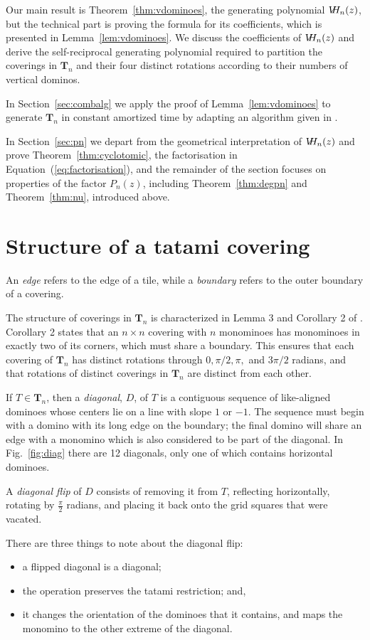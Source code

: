 \documentclass[12pt]{amsart}
\newcommand{\lref}[1]{Lemma~\ref{lem:#1}}
\newcommand{\eref}[1]{Equation~(\ref{eq:#1})}
\newcommand{\sref}[1]{Section~\ref{sec:#1}}
\newcommand{\tref}[1]{Theorem~\ref{thm:#1}}
\newcommand{\fref}[1]{Fig.~\ref{fig:#1}}
\newcommand{\Tn}[1]{\mathbf T_{#1}}
\newcommand{\vh}{V\hspace{-5pt}H}
\begin{document}
Our main result is \tref{vdominoes}, the generating polynomial
$\vh_n(z)$, but the technical part is proving the formula for its
coefficients, which is presented in \lref{vdominoes}.  We discuss the
coefficients of $\vh_n(z)$ and derive the self-reciprocal generating
polynomial required to partition the coverings in $\Tn{n}$ and their
four distinct rotations according to their numbers of vertical
dominos.

In \sref{combalg} we apply the proof of \lref{vdominoes} to generate
$\Tn{n}$ in constant amortized time by adapting an algorithm given in
\cite{BaronaigienRuskey1993}.

In \sref{pn} we depart from the geometrical interpretation of
$\vh_n(z)$ and prove \tref{cyclotomic}, the factorisation in
\eref{factorisation}, and the remainder of the section focuses on
properties of the factor $P_n(z)$, including \tref{degpn} and
\tref{nu}, introduced above.


\section{Structure of a tatami covering}
\label{sec:structure}
An \emph{edge} refers to the edge of a tile, while a \emph{boundary}
refers to the outer boundary of a covering.

The structure of coverings in $\Tn{n}$ is characterized in Lemma 3 and
Corollary 2 of \cite{EricksonRuskeySchurch2011}.  Corollary 2 states
that an $n\times n$ covering with $n$ monominoes has monominoes in
exactly two of its corners, which must share a boundary.  This ensures
that each covering of $\Tn{n}$ has distinct rotations through
$0,\pi/2,\pi,$ and $3\pi/2$ radians, and that rotations of distinct
coverings in $\Tn{n}$ are distinct from each other.

If $T\in \Tn{n}$, then a \emph{diagonal}, $D$, of $T$ is a contiguous
sequence of like-aligned dominoes whose centers lie on a line with
slope $1$ or $-1$.  The sequence must begin with a domino with its
long edge on the boundary; the final domino will share an edge with a
monomino which is also considered to be part of the diagonal.  In
\fref{diag} there are 12 diagonals, only one of which contains
horizontal dominoes.

A \emph{diagonal flip} of $D$ consists of removing it from $T$,
reflecting horizontally, rotating by $\frac{\pi}{2}$ radians, and
placing it back onto the grid squares that were vacated.

There are three things to note about the diagonal flip:
\begin{itemize}
\item a flipped diagonal is a diagonal;
\item the operation preserves the tatami restriction; and,
\item it changes the orientation of the dominoes that it contains, and
  maps the monomino to the other extreme of the diagonal.
\end{itemize}
\end{document}
